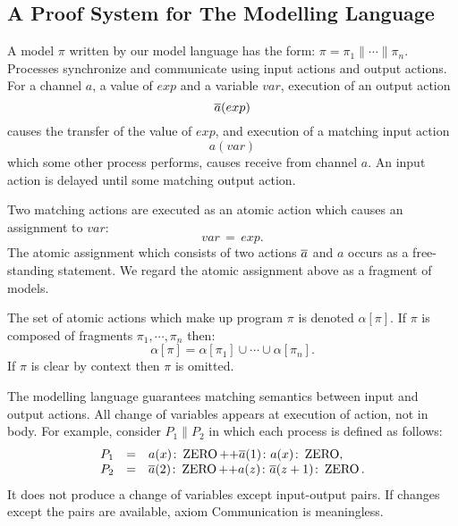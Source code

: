 \documentclass[12pt,a4paper,titlepage]{article}
\theoremstyle{break}
\begin{document}
\subsection{A Proof System for The Modelling Language}\label{sec:ProofSystems}
A model \(\pi\) written by our model language has the form: \(\pi=\pi_1\|\cdots\|\pi_n\).
Processes synchronize and communicate using input actions and output actions.
For a channel \(a\), a value of \(exp\) and a variable \(var\), execution of an output action
  \begin{displaymath}
\mbox{$\overline{a}$}(exp)
  \end{displaymath}
causes the transfer of the value of \(exp\), and execution of a matching input action 
  \begin{displaymath}
a(var)
  \end{displaymath}
which some other process performs, causes receive from channel \(a\).
An input action is delayed until some matching output action.

Two matching actions are executed as an atomic action which causes an assignment to \(var\):
  \begin{displaymath}
var\,=\,exp.
  \end{displaymath}
The atomic assignment which consists of two actions \(\mbox{$\overline{a}$}\) and \(a\) occurs as a free-standing statement.
We regard the atomic assignment above as a fragment of models.

The set of atomic actions which make up program \(\pi\) is denoted \(\alpha[\pi]\).
If \(\pi\) is composed of fragments \(\pi_1,\cdots,\pi_n\) then:
  \begin{displaymath}
\alpha[\pi]=\alpha[\pi_1]\cup\cdots\cup\alpha[\pi_n].
  \end{displaymath}
If \(\pi\) is clear by context then \(\pi\) is omitted.

The modelling language guarantees matching semantics between input and output actions.
All change of variables appears at execution of action, not in body.
For example, consider \(P_1\|P_2\) in which each process is defined as follows:
  \begin{displaymath}
    \begin{array}{lcl}
P_1&=&a(x)\colon\mathop{\mathrm{ZERO}}\nolimits\mbox{++}\mbox{$\overline{a}$}(1)\colon a(x)\colon\mathop{\mathrm{ZERO}}\nolimits,\\
P_2&=&\mbox{$\overline{a}$}(2)\colon\mathop{\mathrm{ZERO}}\nolimits\mbox{++}a(z)\colon\mbox{$\overline{a}$}(z+1)\colon\mathop{\mathrm{ZERO}}\nolimits.
    \end{array}
  \end{displaymath}
It does not produce a change of variables except input-output pairs.
If changes except the pairs are available, axiom Communication is meaningless.
\end{document}
